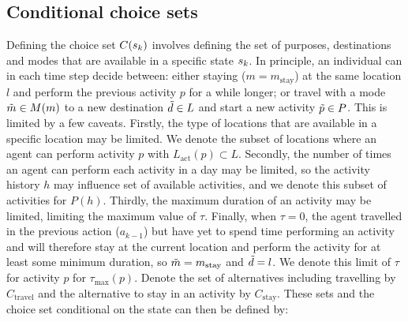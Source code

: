 \subsection{Conditional choice sets}
Defining the choice set $C(s_{k})$ involves defining the set of purposes, destinations and modes that are available in a specific state $s_{k}$.
In principle, an individual can in each time step decide between: either staying ($m=m_\text{stay}$) at the same location $l$ and perform the previous activity $p$ for a while longer; or travel with a mode $\tilde{m}\in M(m)$ to a new destination $\tilde{d} \in L$ and start a new activity $\tilde{p} \in P$. This is limited by a few caveats. Firstly, the type of locations that are available in a specific location may be limited. We denote the subset of locations where an agent can perform activity $p$ with $L_\text{act}(p)\subset L$. Secondly, the number of times an agent can perform each activity in a day may be limited, so the activity history $h$ may influence set of available activities, and we denote this subset of activities for $P(h)$. 
Thirdly, the maximum duration of an activity may be limited, limiting the maximum value of $\tau$. Finally, when $\tau=0$, the agent travelled in the previous action ($a_{k-1}$) but have yet to spend time performing an activity and will therefore stay at the current location and perform the activity for at least some minimum duration, so $\tilde{m} = m_{\text{stay}}$ and $\tilde{d}=l$.  We denote this limit of $\tau$ for activity $p$ for $\tau_\text{max}(p)$. Denote the set of alternatives including travelling by $C_\text{travel}$ and the alternative to stay in an activity by $C_\text{stay}$. These sets and the choice set conditional on the state can then be defined by:
